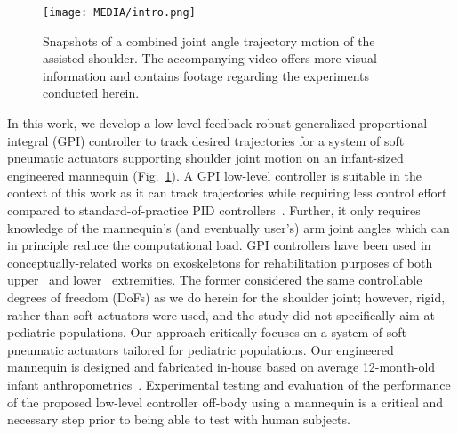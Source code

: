 \documentclass[letterpaper, 10pt, conference]{ieeeconf}      %
\begin{document}
\begin{figure}[!t]
   \vspace{6pt}
   \centering
     \texttt{[image: MEDIA/intro.png]}
     \vspace{-18pt}
      \caption{Snapshots of a combined joint angle trajectory motion of the assisted shoulder. The accompanying video offers more visual information and contains footage regarding the experiments conducted herein.}
      \label{fig:intro}
      \vspace{-6pt}
\end{figure}


In this work, we develop a low-level feedback robust generalized proportional integral (GPI) controller to track desired trajectories for a system of soft pneumatic actuators supporting shoulder joint motion on an infant-sized engineered mannequin (Fig.~\ref{fig:intro}). A GPI low-level controller is suitable in the context of this work as it can track trajectories while requiring less control effort compared to standard-of-practice PID controllers~\cite{blanco2022robust}. Further, it only requires knowledge of the mannequin's (and eventually user's) arm joint angles which can in principle reduce the computational load. GPI controllers have been used in conceptually-related works on exoskeletons for rehabilitation purposes of both upper~\cite{blanco2022robust} and lower~\cite{azcaray2018robust} extremities. The former considered the same controllable degrees of freedom (DoFs) as we do herein for the shoulder joint; however, rigid, rather than soft actuators were used, and the study did not specifically aim at pediatric populations. 
%
%
Our approach critically focuses on a system of soft pneumatic actuators tailored for pediatric populations. Our engineered mannequin is designed and fabricated in-house based on average 12-month-old infant anthropometrics~\cite{Fryar2021,edmond2020normal}. 
Experimental testing and evaluation of the performance of the proposed low-level controller off-body using a mannequin is a critical and necessary step prior to being able to test with human subjects. 



\end{document}
